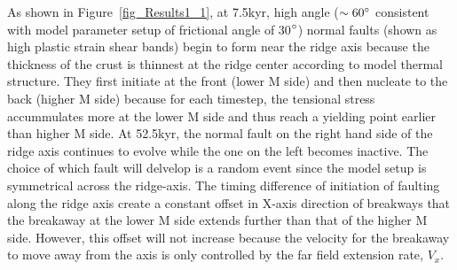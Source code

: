 
As shown in Figure~\ref{fig_Results1_1}, at 7.5kyr, high angle ($\sim 60 \degree$ consistent with model parameter setup of frictional angle of 30$\degree$) normal faults (shown as high plastic strain shear bands) begin to form near the ridge axis because the thickness of the crust is thinnest at the ridge center according to model thermal structure. They first initiate at the front (lower M side) and then nucleate to the back (higher M side) because for each timestep, the tensional stress accummulates more at the lower M side and thus reach a yielding point earlier than higher M side. At 52.5kyr, the normal fault on the right hand side of the ridge axis continues to evolve while the one on the left becomes inactive. The choice of which fault will delvelop is a random event since the model setup is symmetrical across the ridge-axis. The timing difference of initiation of faulting along the ridge axis create a constant offset in X-axis direction of breakways that the breakaway at the lower M side extends further than that of the higher M side. However, this offset will not increase because the velocity for the breakaway to move away from the axis is only controlled by the far field extension rate, $V_{x}$.

